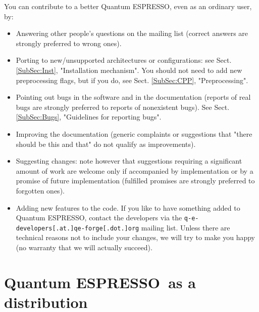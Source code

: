 \documentclass[12pt,a4paper]{article}
\def\qe{{\sc Quantum ESPRESSO}}
\begin{document}
You can contribute to a better \qe, even as an ordinary user, by:
\begin{itemize}
\item Answering other people's questions on the mailing list (correct
  answers are strongly preferred to wrong ones). 
\item Porting to new/unsupported architectures or configurations: see
  Sect. \ref{SubSec:Inst}, "Installation mechanism". You should
  not need to add new preprocessing flags, but if you do, 
  see Sect. \ref{SubSec:CPP}, "Preprocessing".
\item Pointing out bugs in the software and in the documentation
  (reports of real bugs are strongly preferred to reports of
  nonexistent bugs). See Sect. \ref{SubSec:Bugs}, "Guidelines 
  for reporting bugs".
\item Improving the documentation (generic complaints or suggestions
  that "there should be this and that" do not qualify as improvements). 
\item Suggesting changes: note however that suggestions requiring a
  significant amount of work are welcome only if accompanied by
  implementation or by a promise of future implementation (fulfilled
  promises are strongly preferred to forgotten ones). 
\item Adding new features to the code. If you like to have something
  added to \qe, contact the developers via the
  \texttt{q-e-developers[.at.]qe-forge[.dot.]org} mailing list.
  Unless there are technical reasons not to include your changes, we 
  will try to make you happy (no warranty that we will actually succeed).
\end{itemize}

\newpage

\section{\qe\ as a distribution}
\end{document}
